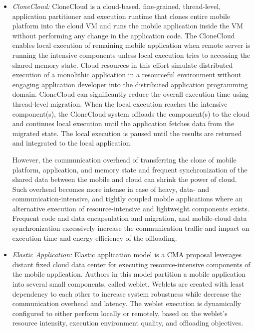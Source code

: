 \documentclass[publish]{IEEEtran}
\begin{document}
\begin{itemize}
\item \textit{CloneCloud:}
CloneCloud \cite{Chun2011}  is a cloud-based, fine-grained, thread-level, application partitioner and execution runtime that clones entire mobile platform into the cloud VM and runs the mobile application inside the VM without performing any change in the application code. The CloneCloud enables local execution of remaining mobile application when remote server is running the intensive components unless local execution tries to accessing the shared memory state. Cloud resources in this effort simulate distributed execution of a monolithic application in a resourceful environment without engaging application developer into the distributed application programming domain. CloneCloud  can significantly reduce the overall execution time using thread-level migration. When the local execution reaches the intensive component(s), the CloneCloud system offloads the component(s) to the cloud and continues local execution until the application fetches data from the migrated state. The local execution is paused until the results are returned and integrated to the local application. 

However, the communication overhead of transferring the clone of mobile platform, application, and memory state and frequent synchronization of the shared data between the mobile and cloud can shrink the power of cloud. Such overhead becomes more intense in case of heavy, data- and communication-intensive, and tightly coupled mobile applications where an alternative execution of resource-intensive and lightweight components exists. Frequent code and data encapsulation and migration, and mobile-cloud data synchronization excessively increase the communication traffic and impact on execution time and energy efficiency of the offloading. 

\item \textit{Elastic Application:}
Elastic application model \cite{Zhang2011} is a CMA proposal leverages distant fixed cloud data center for executing resource-intensive components of the mobile application. Authors in this model partition a mobile application into several small components, called weblet. Weblets are created with least dependency to each other to increase system robustness while decrease the communication overhead and latency. The weblet execution is dynamically configured to either perform locally or remotely, based on the weblet's resource intensity, execution environment quality, and offloading objectives.


\end{itemize}
\end{document}
